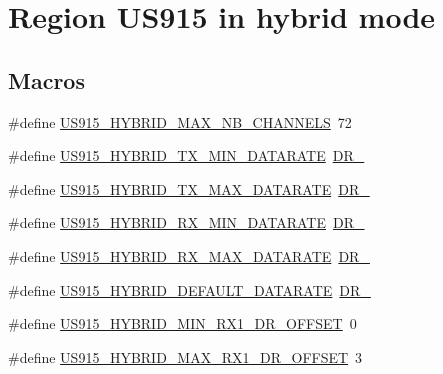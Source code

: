 \hypertarget{group__REGIONUS915HYB}{}\section{Region U\+S915 in hybrid mode}
\label{group__REGIONUS915HYB}
\subsection*{Macros}
\begin{DoxyCompactItemize}
\item 
\#define \hyperlink{group__REGIONUS915HYB_ga977b73cbf7a5d15e2bf543fad5f35710}{U\+S915\+\_\+\+H\+Y\+B\+R\+I\+D\+\_\+\+M\+A\+X\+\_\+\+N\+B\+\_\+\+C\+H\+A\+N\+N\+E\+LS}~72
\item 
\#define \hyperlink{group__REGIONUS915HYB_ga6c7ab6789cb7bb1a5c1e22833905f787}{U\+S915\+\_\+\+H\+Y\+B\+R\+I\+D\+\_\+\+T\+X\+\_\+\+M\+I\+N\+\_\+\+D\+A\+T\+A\+R\+A\+TE}~\hyperlink{group__REGION_ga6c4ef966b4f3d5eb7597b087f2b97095}{D\+R\+\_}
\item 
\#define \hyperlink{group__REGIONUS915HYB_ga41872f6bb20d1dca0b778205ada36348}{U\+S915\+\_\+\+H\+Y\+B\+R\+I\+D\+\_\+\+T\+X\+\_\+\+M\+A\+X\+\_\+\+D\+A\+T\+A\+R\+A\+TE}~\hyperlink{group__REGION_ga6ceba6158a7dab238e9d0b846fb47a0c}{D\+R\+\_}
\item 
\#define \hyperlink{group__REGIONUS915HYB_gaf3c327837e52fbc665c3857f3731c5fe}{U\+S915\+\_\+\+H\+Y\+B\+R\+I\+D\+\_\+\+R\+X\+\_\+\+M\+I\+N\+\_\+\+D\+A\+T\+A\+R\+A\+TE}~\hyperlink{group__REGION_ga44cc96ba80ae464cd9330b784d329c16}{D\+R\+\_}
\item 
\#define \hyperlink{group__REGIONUS915HYB_ga10a143c061143776288b241e17c1b58d}{U\+S915\+\_\+\+H\+Y\+B\+R\+I\+D\+\_\+\+R\+X\+\_\+\+M\+A\+X\+\_\+\+D\+A\+T\+A\+R\+A\+TE}~\hyperlink{group__REGION_ga226f47470cc69a6fe831f7c92709bc1f}{D\+R\+\_}
\item 
\#define \hyperlink{group__REGIONUS915HYB_ga1ab202b7df1ef278c238dd8958ea0d8a}{U\+S915\+\_\+\+H\+Y\+B\+R\+I\+D\+\_\+\+D\+E\+F\+A\+U\+L\+T\+\_\+\+D\+A\+T\+A\+R\+A\+TE}~\hyperlink{group__REGION_ga6c4ef966b4f3d5eb7597b087f2b97095}{D\+R\+\_}
\item 
\#define \hyperlink{group__REGIONUS915HYB_ga526b61da154115ac916e9f217d50cd07}{U\+S915\+\_\+\+H\+Y\+B\+R\+I\+D\+\_\+\+M\+I\+N\+\_\+\+R\+X1\+\_\+\+D\+R\+\_\+\+O\+F\+F\+S\+ET}~0
\item 
\#define \hyperlink{group__REGIONUS915HYB_ga1e70e7e114c0fd6bf905085e78def426}{U\+S915\+\_\+\+H\+Y\+B\+R\+I\+D\+\_\+\+M\+A\+X\+\_\+\+R\+X1\+\_\+\+D\+R\+\_\+\+O\+F\+F\+S\+ET}~3

\end{DoxyCompactItemize}
